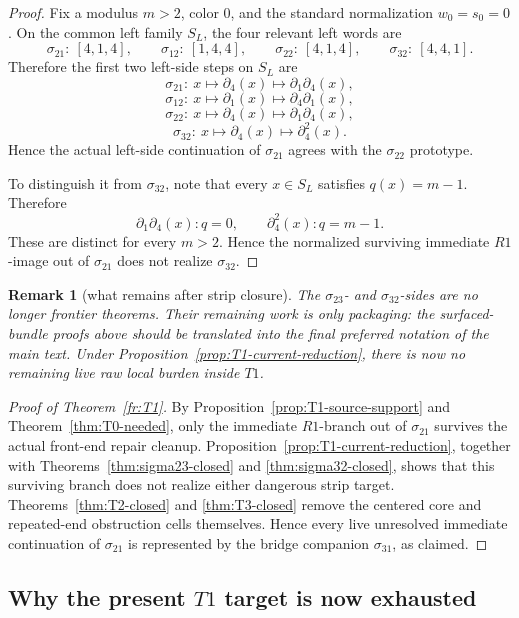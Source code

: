 \documentclass[11pt]{article}
\newtheorem{remark}[theorem]{Remark}
\newcommand{\sig}[2]{\sigma_{#1#2}}
\begin{document}
\begin{proof}
Fix a modulus \(m>2\), color \(0\), and the standard normalization
\(w_0=s_0=0\).
On the common left family \(S_L\), the four relevant left words are
\[
\sig21:\ [4,1,4],\qquad
\sig12:\ [1,4,4],\qquad
\sig22:\ [4,1,4],\qquad
\sig32:\ [4,4,1].
\]
Therefore the first two left-side steps on \(S_L\) are
\[
\sig21:\ x\mapsto \partial_4(x)\mapsto \partial_1\partial_4(x),
\]
\[
\sig12:\ x\mapsto \partial_1(x)\mapsto \partial_4\partial_1(x),
\]
\[
\sig22:\ x\mapsto \partial_4(x)\mapsto \partial_1\partial_4(x),
\]
\[
\sig32:\ x\mapsto \partial_4(x)\mapsto \partial_4^2(x).
\]
Hence the actual left-side continuation of \(\sig21\) agrees with the
\(\sig22\) prototype.

To distinguish it from \(\sig32\), note that every \(x\in S_L\) satisfies
\(q(x)=m-1\).  Therefore
\[
\partial_1\partial_4(x): q=0,
\qquad
\partial_4^2(x): q=m-1.
\]
These are distinct for every \(m>2\).  Hence the normalized surviving
immediate \(R1\)-image out of \(\sig21\) does not realize \(\sig32\).
\end{proof}

\begin{remark}[what remains after strip closure]
The \(\sig23\)- and \(\sig32\)-sides are no longer frontier theorems.
Their remaining work is only packaging: the surfaced-bundle proofs above should
be translated into the final preferred notation of the main text.
Under Proposition~\ref{prop:T1-current-reduction}, there is now no remaining
live raw local burden inside \(T1\).
\end{remark}

\begin{proof}[Proof of Theorem~\ref{fr:T1}]
By Proposition~\ref{prop:T1-source-support} and Theorem~\ref{thm:T0-needed},
only the immediate \(R1\)-branch out of \(\sig21\) survives the actual front-end
repair cleanup.  Proposition~\ref{prop:T1-current-reduction}, together with
Theorems~\ref{thm:sigma23-closed} and \ref{thm:sigma32-closed}, shows that this
surviving branch does not realize either dangerous strip target.
Theorems~\ref{thm:T2-closed} and \ref{thm:T3-closed} remove the centered core
and repeated-end obstruction cells themselves.  Hence every live unresolved
immediate continuation of \(\sig21\) is represented by the bridge companion
\(\sig31\), as claimed.
\end{proof}

\subsection{\texorpdfstring{Why the present \(T1\) target is now exhausted}{Why the present T1 target is now exhausted}}
\end{document}
